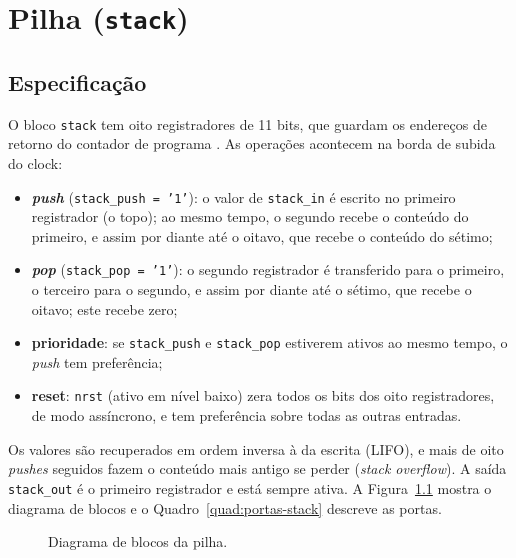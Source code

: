 \chapter{Pilha (\texttt{stack})}
\label{cap:stack}

\section{Especificação}

O bloco \texttt{stack} tem oito registradores de 11 bits, que guardam os endereços de retorno do contador de programa \cite{tp2}. As operações acontecem na borda de subida do clock:

\begin{itemize}
  \item \textbf{\textit{push}} (\texttt{stack\_push = '1'}): o valor de \texttt{stack\_in} é escrito no primeiro registrador (o topo); ao mesmo tempo, o segundo recebe o conteúdo do primeiro, e assim por diante até o oitavo, que recebe o conteúdo do sétimo;
  \item \textbf{\textit{pop}} (\texttt{stack\_pop = '1'}): o segundo registrador é transferido para o primeiro, o terceiro para o segundo, e assim por diante até o sétimo, que recebe o oitavo; este recebe zero;
  \item \textbf{prioridade}: se \texttt{stack\_push} e \texttt{stack\_pop} estiverem ativos ao mesmo tempo, o \textit{push} tem preferência;
  \item \textbf{reset}: \texttt{nrst} (ativo em nível baixo) zera todos os bits dos oito registradores, de modo assíncrono, e tem preferência sobre todas as outras entradas.
\end{itemize}

Os valores são recuperados em ordem inversa à da escrita (LIFO), e mais de oito \textit{pushes} seguidos fazem o conteúdo mais antigo se perder (\textit{stack overflow}). A saída \texttt{stack\_out} é o primeiro registrador e está sempre ativa. A Figura~\ref{fig:bloco-stack} mostra o diagrama de blocos e o Quadro~\ref{quad:portas-stack} descreve as portas.

\begin{figure}[htb]
\caption{Diagrama de blocos da pilha.}\label{fig:bloco-stack}
\centering
{}
\end{figure}


